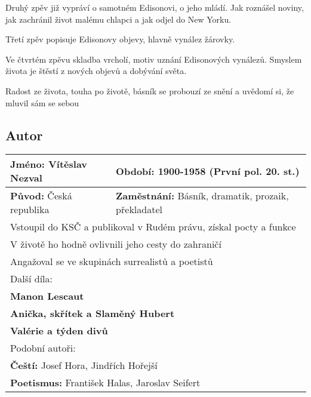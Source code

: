 Druhý zpěv již vypráví o samotném Edisonovi, o jeho mládí.
Jak roznášel noviny, jak zachránil život malému chlapci a jak odjel do New Yorku.

Třetí zpěv popisuje Edisonovy objevy, hlavně vynález žárovky.

Ve čtvrtém zpěvu skladba vrcholí, motiv uznání Edisonových vynálezů.
Smyslem života je štěstí z nových objevů a dobývání světa.

Radost ze života, touha po životě, básník se probouzí ze snění a uvědomí si, že mluvil sám se sebou
\subsection*{Autor}
\begin{tabularx}{\linewidth}{l|l}
  \textbf{Jméno:} Vítěslav Nezval & \textbf{Období:} 1900-1958 (První pol. 20. st.)             \\
  \hline
  \textbf{Původ:} Česká republika & \textbf{Zaměstnání:} Básník, dramatik, prozaik, překladatel \\
  \hline
  \multicolumn{2}{l}{Vstoupil do KSČ a publikoval v Rudém právu, získal pocty a funkce}         \\
  \multicolumn{2}{l}{V životě ho hodně ovlivnili jeho cesty do zahraničí}                       \\
  \multicolumn{2}{l}{Angažoval se ve skupinách surrealistů a poetistů}                          \\
  \hline
  \multicolumn{2}{l}{Další díla:}                                                               \\
  \multicolumn{2}{l}{\textbf{Manon Lescaut}}                                                    \\
  \multicolumn{2}{l}{\textbf{Anička, skřítek a Slaměný Hubert}}                                 \\
  \multicolumn{2}{l}{\textbf{Valérie a týden divů}}                                             \\
  \hline
  \multicolumn{2}{l}{Podobní autoři:}                                                           \\
  \multicolumn{2}{l}{\textbf{Čeští:} Josef Hora, Jindřích Hořejší}                              \\
  \multicolumn{2}{l}{\textbf{Poetismus:} František Halas, Jaroslav Seifert}                     \\
\end{tabularx}

